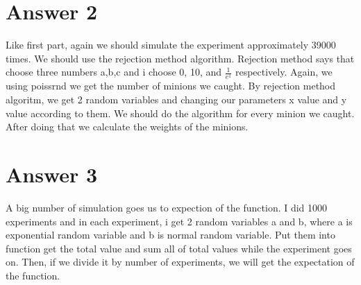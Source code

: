 \documentclass[12pt]{article}
\begin{document}
\section*{Answer 2}
Like first part, again we should simulate the experiment approximately 39000 times. We should use the rejection method algorithm. Rejection method says that choose three numbers a,b,c and i choose 0, 10, and $\frac{1}{e^1}$ respectively. Again, we using poissrnd we get the number of minions we caught. By rejection method algoritm, we get 2 random variables and changing our parameters x value and y value according to them. We should do the algorithm for every minion we caught. After doing that we calculate the weights of the minions.



\section*{Answer 3}
A big number of simulation goes us to expection of the function. I did 1000 experiments and in each experiment, i get 2 random variables a and b, where a is exponential random variable and b is normal random variable. Put them into function get the total value and sum all of total values while the experiment goes on. Then, if we divide it by number of experiments, we will get the expectation of the function.
\end{document}
